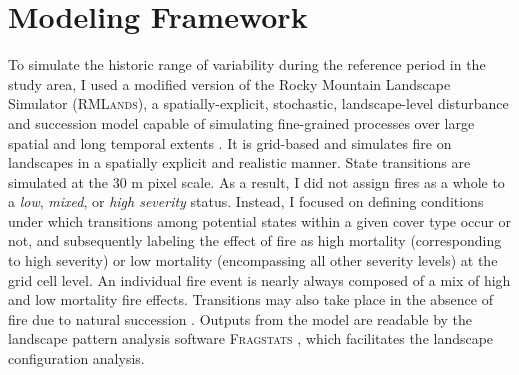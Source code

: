\section{Modeling Framework}

To simulate the historic range of variability during the reference period in the study area, I used a modified version of the Rocky Mountain Landscape Simulator (\textsc{RMLands}), a spatially-explicit, stochastic, landscape-level disturbance and succession model capable of simulating fine-grained processes over large spatial and long temporal extents \citep{McGarigal2001}. It is grid-based and simulates fire on landscapes in a spatially explicit and realistic manner. State transitions are simulated at the 30 m pixel scale. As a result, I did not assign fires as a whole to a \emph{low}, \emph{mixed}, or \emph{high severity} status. Instead, I focused on defining conditions under which transitions among potential states within a given cover type occur or not, and subsequently labeling the effect of fire as high mortality (corresponding to high severity) or low mortality (encompassing all other severity levels) at the grid cell level. An individual fire event is nearly always composed of a mix of high and low mortality fire effects. Transitions may also take place in the absence of fire due to natural succession \citep{McGarigal2012}. Outputs from the model are readable by the landscape pattern analysis software \textsc{Fragstats} \citep{Fragstats2012}, which facilitates the landscape configuration analysis.

